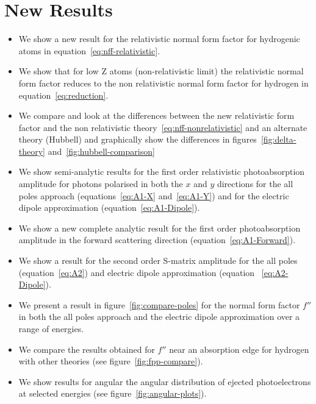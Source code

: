 \section{New Results}

\begin{itemize}
\item We show a new result for the relativistic normal form factor
      for hydrogenic atoms in equation~\ref{eq:nff-relativistic}.
\item We show that for low Z atoms (non-relativistic limit)
      the relativistic normal form factor reduces to the non
      relativistic normal form factor for hydrogen in equation~\ref{eq:reduction}.
\item We compare and look at the differences between the new relativistic
      form factor and the non relativistic theory~\ref{eq:nff-nonrelativistic}
      and an alternate theory (Hubbell) and graphically
      show the differences in figures~\ref{fig:delta-theory} 
      and~\ref{fig:hubbell-comparison}

\item We show semi-analytic results for the first order relativistic
photoabsorption amplitude for photons polarised in both the $x$ and $y$
directions for the all poles approach (equations~\ref{eq:A1-X}
and~\ref{eq:A1-Y}) 
and for the electric dipole approximation (equation~\ref{eq:A1-Dipole}).

\item We show a new complete analytic result for the first order
photoabsorption amplitude in the forward scattering direction
(equation~\ref{eq:A1-Forward}).

\item We show a result for the second order S-matrix amplitude for the
      all poles (equation~\ref{eq:A2}) and electric dipole 
      approximation (equation ~\ref{eq:A2-Dipole}).

\item We present a result in figure~\ref{fig:compare-poles} for the normal form factor $f''$
      in both the all poles approach and the electric dipole approximation
      over a range of energies.

\item We compare the results obtained for $f''$ near an absorption edge for
      hydrogen with other theories (see figure~\ref{fig:fpp-compare}).

\item We show results for angular the angular distribution of ejected 
      photoelectrons at selected energies (see figure~\ref{fig:angular-plots}).

\end{itemize}

